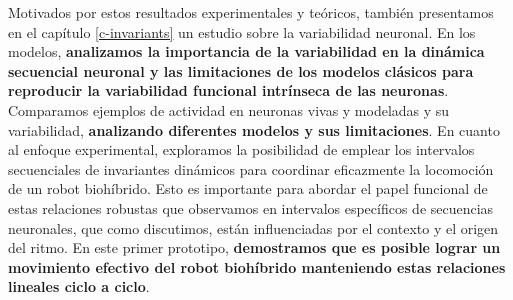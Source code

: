 Motivados por estos resultados experimentales y teóricos, también presentamos en el capítulo \ref{c-invariants} un estudio sobre la variabilidad neuronal. En los modelos, \textbf{analizamos la importancia de la variabilidad en la dinámica secuencial neuronal y las limitaciones de los modelos clásicos para reproducir la variabilidad funcional intrínseca de las neuronas}. Comparamos ejemplos de actividad en neuronas vivas y modeladas y su variabilidad, \textbf{analizando diferentes modelos y sus limitaciones}. En cuanto al enfoque experimental, exploramos la posibilidad de emplear los intervalos secuenciales de invariantes dinámicos para coordinar eficazmente la locomoción de un robot biohíbrido. Esto es importante para abordar el papel funcional de estas relaciones robustas que observamos en intervalos específicos de secuencias neuronales, que como discutimos, están influenciadas por el contexto y el origen del ritmo. En este primer prototipo, \textbf{demostramos que es posible lograr un movimiento efectivo del robot biohíbrido manteniendo estas relaciones lineales ciclo a ciclo}.

